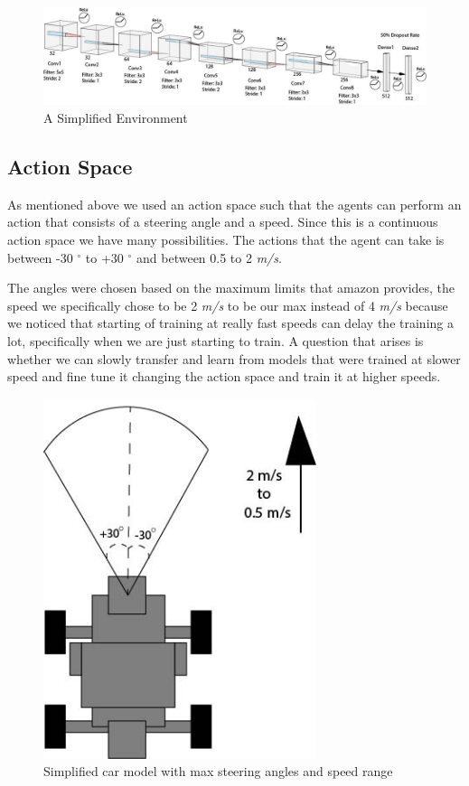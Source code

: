 \documentclass[journal]{IEEEtran}
\begin{document}
\begin{figure}[t]
\begin{center}
\includegraphics[width=\textwidth]{freire-arch}
\end{center}
\vspace{-2mm}
\caption{A Simplified Environment}
\label{freire_arch}
\end{figure}

\subsection{Action Space}
As mentioned above we used an action space such that the agents can perform an action that consists of a steering angle and a speed.  Since this is a continuous action space we have many possibilities.  The actions that the agent can take is between -30 $^{\circ}$ to +30 $^{\circ}$ and between 0.5 to 2 \emph{m/s}. 

The angles were chosen based on the maximum limits that amazon provides, the speed we specifically chose to be 2 \emph{m/s} to be our max instead of 4 \emph{m/s} because we noticed that starting of training at really fast speeds can delay the training a lot, specifically when we are just starting to train.  A question that arises is whether we can slowly transfer and learn from models that were trained at slower speed and fine tune it changing the action space and train it at higher speeds. 

\begin{figure}[htbp]
\begin{center}
\includegraphics[width=8cm]{model-S}
\end{center}
\vspace{-2mm}
\caption{Simplified car model with max steering angles and speed range}
\label{car}
\end{figure}
\end{document}
